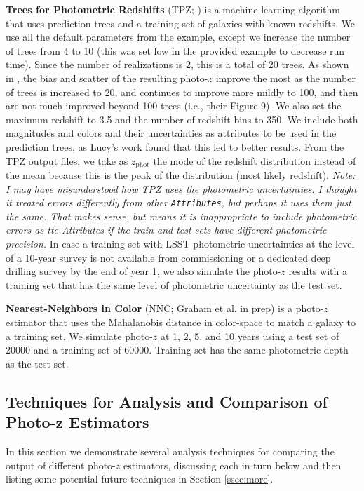 \documentclass[DM,lsstdraft,toc]{lsstdoc}
\begin{document}
\textbf{Trees for Photometric Redshifts} (TPZ; \citealt{2013ascl.soft04011C,2013MNRAS.432.1483C}) is a machine learning algorithm that uses prediction trees and a training set of galaxies with known redshifts. We use all the default parameters from the example, except we increase the number of trees from 4 to 10 (this was set low in the provided example to decrease run time). Since the number of realizations is 2, this is a total of 20 trees. As shown in \cite{2013MNRAS.432.1483C}, the bias and scatter of the resulting photo-$z$ improve the most as the number of trees is increased to 20, and continues to improve more mildly to 100, and then are not much improved beyond 100 trees (i.e., their Figure 9). We also set the maximum redshift to 3.5 and the number of redshift bins to 350. We include both magnitudes and colors and their uncertainties as attributes to be used in the prediction trees, as Lucy's work found that this led to better results. From the TPZ output files, we take as $z_\mathrm{phot}$ the mode of the redshift distribution instead of the mean because this is the peak of the distribution (most likely redshift). \textit{Note: I may have misunderstood how TPZ uses the photometric uncertainties. I thought it treated errors differently from other \texttt{Attributes}, but perhaps it uses them just the same. That makes sense, but means it is inappropriate to include photometric errors as {ttc Attributes} if the train and test sets have different photometric precision.} In case a training set with LSST photometric uncertainties at the level of a 10-year survey is not available from commissioning or a dedicated deep drilling survey by the end of year 1, we also simulate the photo-$z$ results with a training set that has the same level of photometric uncertainty as the test set.

\textbf{Nearest-Neighbors in Color} (NNC; Graham et al. in prep) is a photo-$z$ estimator that uses the Mahalanobis distance in color-space to match a galaxy to a training set. We simulate photo-$z$ at 1, 2, 5, and 10 years using a test set of 20000 and a training set of 60000. Training set has the same photometric depth as the test set.


\subsection{Techniques for Analysis and Comparison of Photo-z Estimators}\label{ssec:comp}

In this section we demonstrate several analysis techniques for comparing the output of different photo-$z$ estimators, discussing each in turn below and then listing some potential future techniques in Section \ref{ssec:more}.
\end{document}

